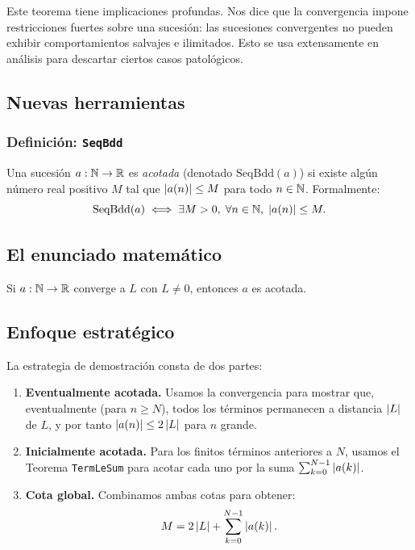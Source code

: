 Este teorema tiene implicaciones profundas. Nos dice que la
convergencia impone restricciones fuertes sobre una sucesión: las
sucesiones convergentes no pueden exhibir comportamientos salvajes e
ilimitados. Esto se usa extensamente en análisis para descartar ciertos
casos patológicos.

\subsection{Nuevas herramientas}

\subsubsection{Definición: \texttt{SeqBdd}}

Una sucesión $a : \mathbb{N} \to \mathbb{R}$ es \emph{acotada} (denotado
$\mathrm{SeqBdd}(a)$) si existe algún número real positivo $M$ tal
que $\left|a(n)\right| \le M$ para todo $n \in \mathbb{N}$. Formalmente:
\[
  \mathrm{SeqBdd}(a)
  \;\Longleftrightarrow\;
  \exists M > 0,\; \forall n \in \mathbb{N},\; \left|a(n)\right| \le M.
\]

\subsection{El enunciado matemático}

\begin{theorem}
  Si $a : \mathbb{N} \to \mathbb{R}$ converge a $L$ con $L \ne 0$, entonces $a$ es
  acotada.
\end{theorem}

\subsection{Enfoque estratégico}

La estrategia de demostración consta de dos partes:

\begin{enumerate}
  \item \textbf{Eventualmente acotada.} Usamos la convergencia para
    mostrar que, eventualmente (para $n \ge N$), todos los términos
    permanecen a distancia $\left|L\right|$ de $L$, y por tanto
    $\left|a(n)\right| \le 2\left|L\right|$ para $n$ grande.

  \item \textbf{Inicialmente acotada.} Para los finitos términos
    anteriores a $N$, usamos el Teorema \texttt{TermLeSum} para
    acotar cada uno por la suma $\sum_{k=0}^{N-1} \left|a(k)\right|$.

  \item \textbf{Cota global.} Combinamos ambas cotas para obtener:
    \[
      M = 2\left|L\right| + \sum_{k=0}^{N-1} \left|a(k)\right|.
    \]
\end{enumerate}

